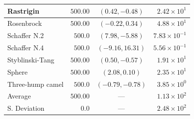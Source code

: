 \begin{longtable}{|l|r|c|r|}
        Rastrigin	        & $500.00$	
                          & $(0.42, -0.48)$	
                          & $2.42 \times 10^1$\\\hline
        Rosenbrock	      & $500.00$	
                          & $(-0.22, 0.34)$	
                          & $4.88 \times 10^1$\\\hline
        Schaffer N.2	    & $500.0$	
                          & $(7.98, -5.88)$	
                          & $7.83 \times 10^{-1}$\\\hline
        Schaffer N.4	    & $500.0$	
                          & $(-9.16, 16.31)$	
                          & $5.56 \times 10^{-1}$\\\hline
        Styblinski-Tang	  & $500.00$	
                          & $(0.50, -0.57)$	
                          & $1.91 \times 10^1$\\\hline
        Sphere	          & $500.00$	
                          & $(2.08, 0.10)$	
                          & $2.35 \times 10^{1}$\\\hline
        Three-hump camel	& $500.0$	
                          & $(-0.79, -0.78)$	
                          & $3.85 \times 10^0$\\\hline
       \hline Average	    & $500.00$	
                          & ---	
                          & $1.13 \times 10^2$\\\hline
       S. Deviation	      & $0.0$	
                          & ---	
                          & $2.48 \times 10^2$\\\hline
      \end{longtable}

